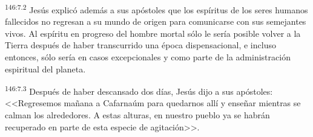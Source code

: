 \par 
\textsuperscript{146:7.2} Jesús explicó además a sus apóstoles que los espíritus de los seres humanos fallecidos no regresan a su mundo de origen para comunicarse con sus semejantes vivos. Al espíritu en progreso del hombre mortal sólo le sería posible volver a la Tierra después de haber transcurrido una época dispensacional, e incluso entonces, sólo sería en casos excepcionales y como parte de la administración espiritual del planeta.

\par 
\textsuperscript{146:7.3} Después de haber descansado dos días, Jesús dijo a sus apóstoles: <<Regresemos mañana a Cafarnaúm para quedarnos allí y enseñar mientras se calman los alrededores. A estas alturas, en nuestro pueblo ya se habrán recuperado en parte de esta especie de agitación>>.
